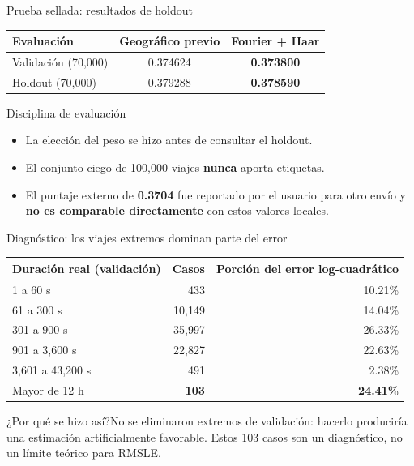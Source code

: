\documentclass[aspectratio=169,11pt]{beamer}
\newcommand{\porq}[1]{\vspace{1.2mm}\begin{block}{¿Por qué se hizo así?}\small #1\end{block}}
\begin{document}
\begin{frame}{Prueba sellada: resultados de holdout}
\small
\begin{center}
\begin{tabular}{lcc}
\toprule
\textbf{Evaluación} & \textbf{Geográfico previo} & \textbf{Fourier + Haar}\\
\midrule
Validación (70,000) & 0.374624 & \textbf{0.373800}\\
Holdout (70,000) & 0.379288 & \textbf{0.378590}\\
\bottomrule
\end{tabular}
\end{center}
\vspace{2mm}
\begin{block}{Disciplina de evaluación}
\begin{itemize}
\item La elección del peso se hizo antes de consultar el holdout.
\item El conjunto ciego de 100,000 viajes \textbf{nunca} aporta etiquetas.
\item El puntaje externo de \textbf{0.3704} fue reportado por el usuario para otro envío y \textbf{no es comparable directamente} con estos valores locales.
\end{itemize}
\end{block}
\end{frame}

\begin{frame}{Diagnóstico: los viajes extremos dominan parte del error}
\small
\begin{center}
\begin{tabular}{lrr}
\toprule
\textbf{Duración real (validación)} & \textbf{Casos} & \textbf{Porción del error log-cuadrático}\\
\midrule
1 a 60 s & 433 & 10.21\%\\
61 a 300 s & 10,149 & 14.04\%\\
301 a 900 s & 35,997 & 26.33\%\\
901 a 3,600 s & 22,827 & 22.63\%\\
3,601 a 43,200 s & 491 & 2.38\%\\
Mayor de 12 h & \textbf{103} & \textbf{24.41\%}\\
\bottomrule
\end{tabular}
\end{center}
\porq{No se eliminaron extremos de validación: hacerlo produciría una estimación artificialmente favorable. Estos 103 casos son un diagnóstico, no un límite teórico para RMSLE.}
\end{frame}
\end{document}
